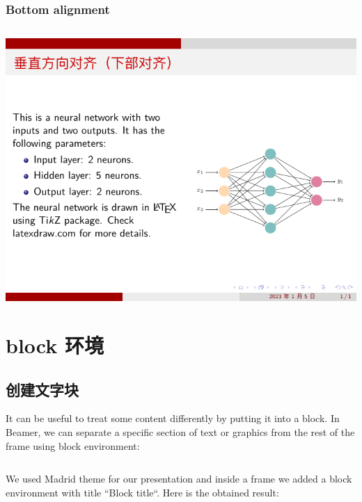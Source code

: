 \subsubsection{Bottom alignment}

\inputminted[linenos=true]{latex}{examples/beamer/column-bottom-alignment.tex}

\includegraphics{examples/beamer/column-bottom-alignment.pdf}

\section{{\ttfamily block} 环境}

\subsection{创建文字块}

It can be useful to treat some content differently by putting it into a block. In Beamer, we can separate a specific section of text or graphics from the rest of the frame using {\ttfamily block} environment:

\inputminted[linenos=true]{latex}{examples/beamer/block-simple1.tex}

We used {\ttfamily Madrid} theme for our presentation and inside a frame we added a block environment with title “Block title“. Here is the obtained result:

